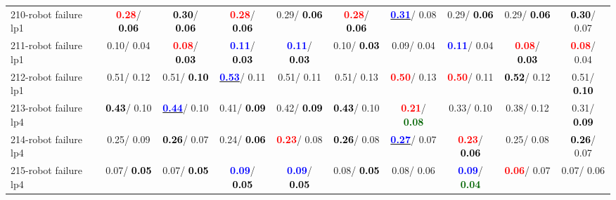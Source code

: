 \begin{table}[h]
\begin{center}
{\begin{tabular}{lc|c|c|c|c|c|c|c|c}
210-robot failure lp1 & \textcolor{red}{\textbf{  0.28}}/\textcolor{black}{\textbf{  0.06}} & \textcolor{black}{\textbf{  0.30}}/\textcolor{black}{\textbf{  0.06}} & \textcolor{red}{\textbf{  0.28}}/\textcolor{black}{\textbf{  0.06}} &   0.29/\textcolor{black}{\textbf{  0.06}} & \textcolor{red}{\textbf{  0.28}}/\textcolor{black}{\textbf{  0.06}} & \underline{\textcolor{blue}{\textbf{  0.31}}}/  0.08 &   0.29/\textcolor{black}{\textbf{  0.06}} &   0.29/\textcolor{black}{\textbf{  0.06}} & \textcolor{black}{\textbf{  0.30}}/  0.07 \\
211-robot failure lp1 &   0.10/  0.04 & \textcolor{red}{\textbf{  0.08}}/\textcolor{black}{\textbf{  0.03}} & \textcolor{blue}{\textbf{  0.11}}/\textcolor{black}{\textbf{  0.03}} & \textcolor{blue}{\textbf{  0.11}}/\textcolor{black}{\textbf{  0.03}} &   0.10/\textcolor{black}{\textbf{  0.03}} &   0.09/  0.04 & \textcolor{blue}{\textbf{  0.11}}/  0.04 & \textcolor{red}{\textbf{  0.08}}/\textcolor{black}{\textbf{  0.03}} & \textcolor{red}{\textbf{  0.08}}/  0.04 \\
212-robot failure lp1 &   0.51/  0.12 &   0.51/\textcolor{black}{\textbf{  0.10}} & \underline{\textcolor{blue}{\textbf{  0.53}}}/  0.11 &   0.51/  0.11 &   0.51/  0.13 & \textcolor{red}{\textbf{  0.50}}/  0.13 & \textcolor{red}{\textbf{  0.50}}/  0.11 & \textcolor{black}{\textbf{  0.52}}/  0.12 &   0.51/\textcolor{black}{\textbf{  0.10}} \\
213-robot failure lp4 & \textcolor{black}{\textbf{  0.43}}/  0.10 & \underline{\textcolor{blue}{\textbf{  0.44}}}/  0.10 &   0.41/\textcolor{black}{\textbf{  0.09}} &   0.42/\textcolor{black}{\textbf{  0.09}} & \textcolor{black}{\textbf{  0.43}}/  0.10 & \textcolor{red}{\textbf{  0.21}}/\textcolor{darkgreen}{\textbf{  0.08}} &   0.33/  0.10 &   0.38/  0.12 &   0.31/\textcolor{black}{\textbf{  0.09}} \\ \hline
214-robot failure lp4 &   0.25/  0.09 & \textcolor{black}{\textbf{  0.26}}/  0.07 &   0.24/\textcolor{black}{\textbf{  0.06}} & \textcolor{red}{\textbf{  0.23}}/  0.08 & \textcolor{black}{\textbf{  0.26}}/  0.08 & \underline{\textcolor{blue}{\textbf{  0.27}}}/  0.07 & \textcolor{red}{\textbf{  0.23}}/\textcolor{black}{\textbf{  0.06}} &   0.25/  0.08 & \textcolor{black}{\textbf{  0.26}}/  0.07 \\
215-robot failure lp4 &   0.07/\textcolor{black}{\textbf{  0.05}} &   0.07/\textcolor{black}{\textbf{  0.05}} & \textcolor{blue}{\textbf{  0.09}}/\textcolor{black}{\textbf{  0.05}} & \textcolor{blue}{\textbf{  0.09}}/\textcolor{black}{\textbf{  0.05}} &   0.08/\textcolor{black}{\textbf{  0.05}} &   0.08/  0.06 & \textcolor{blue}{\textbf{  0.09}}/\textcolor{darkgreen}{\textbf{  0.04}} & \textcolor{red}{\textbf{  0.06}}/  0.07 &   0.07/  0.06 \\

\end{tabular}}
\end{center}
\end{table}
